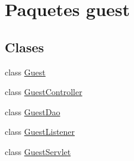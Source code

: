 \hypertarget{namespaceguest}{}\section{Paquetes guest}
\label{namespaceguest}
\subsection*{Clases}
\begin{DoxyCompactItemize}
\item 
class \mbox{\hyperlink{classguest_1_1_guest}{Guest}}
\item 
class \mbox{\hyperlink{classguest_1_1_guest_controller}{Guest\+Controller}}
\item 
class \mbox{\hyperlink{classguest_1_1_guest_dao}{Guest\+Dao}}
\item 
class \mbox{\hyperlink{classguest_1_1_guest_listener}{Guest\+Listener}}
\item 
class \mbox{\hyperlink{classguest_1_1_guest_servlet}{Guest\+Servlet}}
\end{DoxyCompactItemize}
